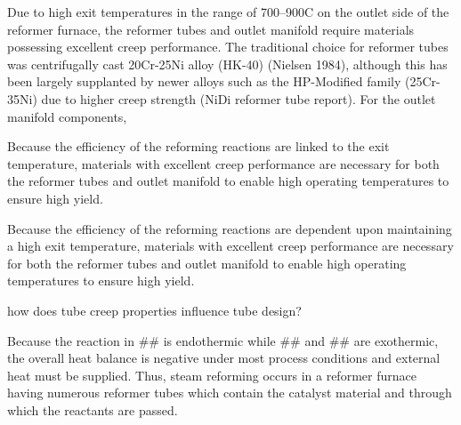 Due to high exit temperatures in the range of 700--900C on the outlet side of the reformer furnace, the reformer tubes and outlet manifold require materials possessing excellent creep performance. The traditional choice for reformer tubes was centrifugally cast 20Cr-25Ni alloy (HK-40) (Nielsen 1984), although this has been largely supplanted by newer alloys such as the HP-Modified family (25Cr-35Ni) due to higher creep strength (NiDi reformer tube report). For the outlet manifold components, 








Because the efficiency of the reforming reactions are linked to the exit temperature, materials with excellent creep performance are necessary for both the reformer tubes and outlet manifold to enable high operating temperatures to ensure high yield.


Because the efficiency of the reforming reactions are dependent upon maintaining a high exit temperature, materials with excellent creep performance are necessary for both the reformer tubes and outlet manifold to enable high operating temperatures to ensure high yield.


how does tube creep properties influence tube design?











Because the reaction in ## is endothermic while ## and ## are exothermic, the overall heat balance is negative under most process conditions and external heat must be supplied. Thus, steam reforming occurs in a reformer furnace having numerous reformer tubes which contain the catalyst material and through which the reactants are passed. 


